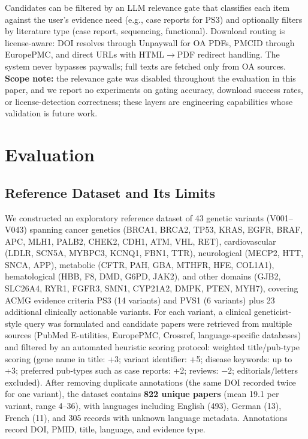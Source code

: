 \documentclass[nonacm,sigconf]{acmart}
\begin{document}
Candidates can be filtered by an LLM relevance gate that classifies each item
against the user's evidence need (e.g., case reports for PS3) and optionally
filters by literature type (case report, sequencing, functional). Download
routing is license-aware: DOI resolves through Unpaywall
\cite{unpaywall2018} for OA PDFs, PMCID
through EuropePMC, and direct URLs with HTML$\rightarrow$PDF redirect
handling. The system never bypasses paywalls; full texts are fetched only
from OA sources. \textbf{Scope note:} the relevance gate was disabled
throughout the evaluation in this paper, and we report no experiments on
gating accuracy, download success rates, or license-detection correctness;
these layers are engineering capabilities whose validation is future work.

\section{Evaluation}
\label{sec:eval}

\subsection{Reference Dataset and Its Limits}
\label{sec:goldstd}

We constructed an exploratory reference dataset of 43 genetic variants
(V001--V043)
spanning cancer genetics (BRCA1, BRCA2, TP53, KRAS, EGFR, BRAF, APC, MLH1,
PALB2, CHEK2, CDH1, ATM, VHL, RET),
cardiovascular (LDLR, SCN5A, MYBPC3, KCNQ1, FBN1, TTR),
neurological (MECP2, HTT, SNCA, APP),
metabolic (CFTR, PAH, GBA, MTHFR, HFE, COL1A1),
hematological (HBB, F8, DMD, G6PD, JAK2),
and other domains (GJB2, SLC26A4, RYR1, FGFR3, SMN1, CYP21A2, DMPK, PTEN,
MYH7), covering ACMG evidence criteria PS3 (14 variants) and PVS1 (6
variants) plus 23 additional clinically actionable variants. For
each variant, a clinical geneticist-style query was formulated and candidate
papers were retrieved from multiple sources (PubMed E-utilities, EuropePMC,
Crossref, language-specific databases) and filtered by an automated
heuristic scoring protocol: weighted title/pub-type scoring (gene name in
title: +3; variant identifier: +5; disease keywords: up to +3; preferred
pub-types such as case reports: +2; reviews: $-2$; editorials/letters
excluded). After removing duplicate annotations (the same DOI recorded
twice for one variant), the dataset contains \textbf{822 unique papers}
(mean 19.1 per variant, range 4--36), with languages including English
(493), German (13), French (11), and 305 records with unknown language
metadata. Annotations record DOI, PMID, title, language, and evidence type.
\end{document}
